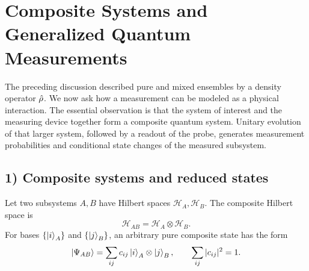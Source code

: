 \section{Composite Systems and Generalized Quantum Measurements}

The preceding discussion described pure and mixed ensembles by a density operator $\hat{\rho}$. We now ask how a measurement can be modeled as a physical interaction. The essential observation is that the system of interest and the measuring device together form a composite quantum system. Unitary evolution of that larger system, followed by a readout of the probe, generates measurement probabilities and conditional state changes of the measured subsystem.

\subsection*{1) Composite systems and reduced states}

Let two subsystems $A,B$ have Hilbert spaces $\mathcal H_A,\mathcal H_B$. The composite Hilbert space is
\begin{equation}
\mathcal H_{AB}=\mathcal H_A\otimes\mathcal H_B.
\end{equation}
For bases $\{\left|i\right\rangle_A\}$ and $\{\left|j\right\rangle_B\}$, an arbitrary pure composite state has the form
\begin{equation}
\left|\Psi_{AB}\right\rangle=\sum_{ij}c_{ij}\left|i\right\rangle_A\otimes\left|j\right\rangle_B,
\qquad\sum_{ij}|c_{ij}|^2=1.
\end{equation}


